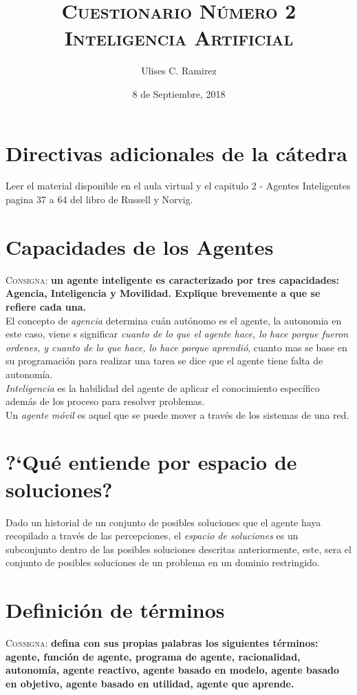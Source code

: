 \documentclass{article}
\title{\textsc{Cuestionario N\'umero 2\\Inteligencia Artificial}}
\author{Ulises C. Ramirez}
\date{8 de Septiembre, 2018}
\begin{document}
\maketitle
{}
\newpage
\tableofcontents
{}
\newpage

\section*{Directivas adicionales de la c\'atedra}
Leer el material disponible en el aula virtual y el capitulo 2 - Agentes Inteligentes pagina 37 a 64 del libro de Russell y Norvig.

\section{Capacidades de los Agentes}
\label{sec:capacidadesagentes}
\textsc{Consigna}: \textbf{un agente inteligente es caracterizado por tres capacidades: Agencia, Inteligencia y Movilidad. Explique brevemente a que se refiere cada una.}\\

El concepto de \textit{agencia} determina cu\'an aut\'onomo es el agente, la autonomia en este caso, viene s significar \textit{cuanto de lo que el agente hace, lo hace porque fueron ordenes, y cuanto de lo que hace, lo hace porque aprendi\'o}, cuanto mas se base en su programaci\'on para realizar una tarea se dice que el agente tiene falta de autonom\'ia.\\
\textit{Inteligencia} es la habilidad del agente de aplicar el conocimiento espec\'ifico adem\'as de los proceso para resolver problemas.\\
Un \textit{agente m\'ovil} es aquel que se puede mover a trav\'es de los sistemas de una red.

\section{?`Qu\'e entiende por espacio de soluciones?}
Dado un historial de un conjunto de posibles soluciones que el agente haya recopilado a trav\'es de las percepciones, el \textit{espacio de soluciones} es un subconjunto dentro de las posibles soluciones descritas anteriormente, este, sera el conjunto de posibles soluciones de un problema en un dominio restringido.

\section{Definici\'on de t\'erminos}
\label{sec:terminos}
\textsc{Consigna}: \textbf{defina con sus propias palabras los siguientes t\'erminos: agente, funci\'on de agente, programa de agente, racionalidad, autonom\'ia, agente reactivo, agente basado en modelo, agente basado en objetivo, agente basado en utilidad, agente que aprende.}
\end{document}

